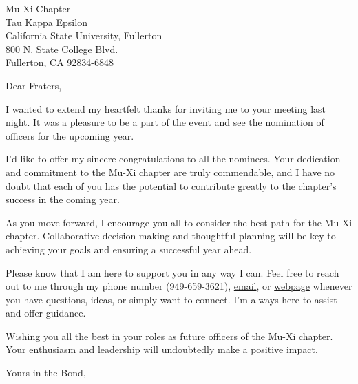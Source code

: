 \documentclass[11pt,letterpaper]{letter}
\begin{document}
 
\begin{letter}{Mu-Xi Chapter \\ Tau Kappa Epsilon \\ California State University, Fullerton \\ 800 N. State College Blvd. \\ Fullerton, CA 92834-6848}
\opening{Dear Fraters,} 


I wanted to extend my heartfelt thanks for inviting me to your meeting last night. It was a pleasure to be a part of the event and see the nomination of officers for the upcoming year.

I'd like to offer my sincere congratulations to all the nominees. Your dedication and commitment to the Mu-Xi chapter are truly commendable, and I have no doubt that each of you has the potential to contribute greatly to the chapter's success in the coming year.

As you move forward, I encourage you all to consider the best path for the Mu-Xi chapter. Collaborative decision-making and thoughtful planning will be key to achieving your goals and ensuring a successful year ahead.

Please know that I am here to support you in any way I can. Feel free to reach out to me through my phone number (949-659-3621), \href{mailto:dpadams@fullerton.edu}{email}, or \href{https://dadams.io}{webpage} whenever you have questions, ideas, or simply want to connect. I'm always here to assist and offer guidance.

Wishing you all the best in your roles as future officers of the Mu-Xi chapter. Your enthusiasm and leadership will undoubtedly make a positive impact.

\closing{Yours in the Bond,}
\end{letter} 
\end{document}
